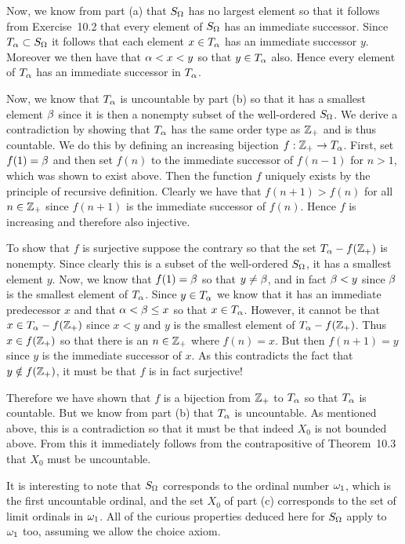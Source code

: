 {{    Now, we know from part (a) that $S_\Omega$ has no largest element so that it follows from Exercise~10.2 that every element of $S_\Omega$ has an immediate successor.
    Since $T_\alpha \subset S_\Omega$ it follows that each element $x \in T_\alpha$ has an immediate successor $y$.
    Moreover we then have that $\alpha < x < y$ so that $y \in T_\alpha$ also.
    Hence every element of $T_\alpha$ has an immediate successor in $T_\alpha$.
    
    Now, we know that $T_\alpha$ is uncountable by part (b) so that it has a smallest element $\beta$ since it is then a nonempty subset of the well-ordered $S_\Omega$.
    We derive a contradiction by showing that $T_\alpha$ has the same order type as ${{\mathbb{Z}}_+}$ and is thus countable.
    We do this by defining an increasing bijection $f: {{\mathbb{Z}}_+} \to T_\alpha$.
    First, set $f(1) = \beta$ and then set $f(n)$ to the immediate successor of $f(n-1)$ for $n > 1$, which was shown to exist above.
    Then the function $f$ uniquely exists by the principle of recursive definition.
    Clearly we have that $f(n+1) > f(n)$ for all $n \in {{\mathbb{Z}}_+}$ since $f(n+1)$ is the immediate successor of $f(n)$.
    Hence $f$ is increasing and therefore also injective.

    To show that $f$ is surjective suppose the contrary so that the set $T_\alpha - f({{\mathbb{Z}}_+})$ is nonempty.
    Since clearly this is a subset of the well-ordered $S_\Omega$, it has a smallest element $y$.
    Now, we know that $f(1) = \beta$ so that $y \neq \beta$, and in fact $\beta < y$ since $\beta$ is the smallest element of $T_\alpha$.
    Since $y \in T_\alpha$ we know that it has an immediate predecessor $x$ and that $\alpha < \beta \leq x$ so that $x \in T_\alpha$.
    However, it cannot be that $x \in T_\alpha - f({{\mathbb{Z}}_+})$ since $x < y$ and $y$ is the smallest element of $T_\alpha - f({{\mathbb{Z}}_+})$.
    Thus $x \in f({{\mathbb{Z}}_+})$ so that there is an $n \in {{\mathbb{Z}}_+}$ where $f(n) = x$.
    But then $f(n+1) = y$ since $y$ is the immediate successor of $x$.
    As this contradicts the fact that $y \notin f({{\mathbb{Z}}_+})$, it must be that $f$ is in fact surjective!

    Therefore we have shown that $f$ is a bijection from ${{\mathbb{Z}}_+}$ to $T_\alpha$ so that $T_\alpha$ is countable.
    But we know from part (b) that $T_\alpha$ is uncountable.
    As mentioned above, this is a contradiction so that it must be that indeed $X_0$ is not bounded above.
    From this it immediately follows from the contrapositive of Theorem~10.3 that $X_0$ must be uncountable.
  }

  It is interesting to note that $S_\Omega$ corresponds to the ordinal number $\omega_1$, which is the first uncountable ordinal, and the set $X_0$ of part (c) corresponds to the set of limit ordinals in $\omega_1$.
  All of the curious properties deduced here for $S_\Omega$ apply to $\omega_1$ too, assuming we allow the choice axiom.
}

